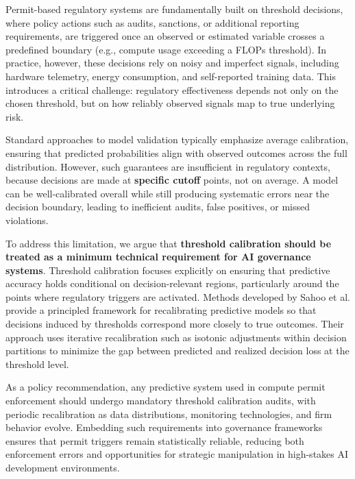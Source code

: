 Permit-based regulatory systems are fundamentally built on threshold decisions, where policy actions such as audits, sanctions, or additional reporting requirements, are triggered once an observed or estimated variable crosses a predefined boundary (e.g., compute usage exceeding a FLOPs threshold). In practice, however, these decisions rely on noisy and imperfect signals, including hardware telemetry, energy consumption, and self-reported training data. This introduces a critical challenge: regulatory effectiveness depends not only on the chosen threshold, but on how reliably observed signals map to true underlying risk. 

Standard approaches to model validation typically emphasize average calibration, ensuring that predicted probabilities align with observed outcomes across the full distribution. However, such guarantees are insufficient in regulatory contexts, because decisions are made at \textbf{specific cutoff }points, not on average. A model can be well-calibrated overall while still producing systematic errors near the decision boundary, leading to inefficient audits, false positives, or missed violations.

To address this limitation, we argue that \textbf{threshold calibration should be treated as a minimum technical requirement for AI governance systems}. Threshold calibration focuses explicitly on ensuring that predictive accuracy holds conditional on decision-relevant regions, particularly around the points where regulatory triggers are activated. Methods developed by Sahoo et al. provide a principled framework for recalibrating predictive models so that decisions induced by thresholds correspond more closely to true outcomes. Their approach uses iterative recalibration such as isotonic adjustments within decision partitions to minimize the gap between predicted and realized decision loss at the threshold level. 

As a policy recommendation, any predictive system used in compute permit enforcement should undergo mandatory threshold calibration audits, with periodic recalibration as data distributions, monitoring technologies, and firm behavior evolve. Embedding such requirements into governance frameworks ensures that permit triggers remain statistically reliable, reducing both enforcement errors and opportunities for strategic manipulation in high-stakes AI development environments.

 